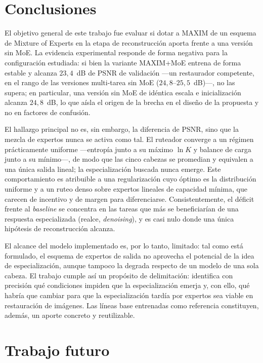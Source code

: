 \documentclass[aps,prl,twocolumn,groupedaddress]{revtex4-2}
\begin{document}
\section{Conclusiones}

El objetivo general de este trabajo fue evaluar si dotar a MAXIM de un esquema de Mixture of Experts en la etapa de reconstrucción aporta frente a una versión sin MoE. La evidencia experimental responde de forma negativa para la configuración estudiada: si bien la variante MAXIM+MoE entrena de forma estable y alcanza $23{,}4$~dB de PSNR de validación ---un restaurador competente, en el rango de las versiones multi-tarea sin MoE ($24{,}8$--$25{,}5$~dB)---, no las supera; en particular, una versión sin MoE de idéntica escala e inicialización alcanza $24{,}8$~dB, lo que aísla el origen de la brecha en el diseño de la propuesta y no en factores de confusión.

El hallazgo principal no es, sin embargo, la diferencia de PSNR, sino que la mezcla de expertos nunca se activa como tal. El ruteador converge a un régimen prácticamente uniforme ---entropía junto a su máximo $\ln K$ y balance de carga junto a su mínimo---, de modo que las cinco cabezas se promedian y equivalen a una única salida lineal; la especialización buscada nunca emerge. Este comportamiento es atribuible a una regularización cuyo óptimo es la distribución uniforme y a un ruteo denso sobre expertos lineales de capacidad mínima, que carecen de incentivo y de margen para diferenciarse. Consistentemente, el déficit frente al \textit{baseline} se concentra en las tareas que más se beneficiarían de una respuesta especializada (realce, \textit{denoising}), y es casi nulo donde una única hipótesis de reconstrucción alcanza.

El alcance del modelo implementado es, por lo tanto, limitado: tal como está formulado, el esquema de expertos de salida no aprovecha el potencial de la idea de especialización, aunque tampoco la degrada respecto de un modelo de una sola cabeza. El trabajo cumple así un propósito de delimitación: identifica con precisión qué condiciones impiden que la especialización emerja y, con ello, qué habría que cambiar para que la especialización tardía por expertos sea viable en restauración de imágenes. Las líneas base entrenadas como referencia constituyen, además, un aporte concreto y reutilizable.

\section{Trabajo futuro}
\end{document}
